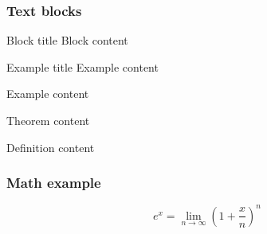 \documentclass{beamer}
\begin{document}
\begin{frame}
  \frametitle{Text blocks}
  
  \begin{block}{Block title}
    Block content
  \end{block}

  \begin{exampleblock}{Example title}
    Example content
  \end{exampleblock}

  \begin{example}
    Example content
  \end{example}

  \begin{theorem}
    Theorem content
  \end{theorem}

  \begin{definition}
    Definition content
  \end{definition}
\end{frame}

\begin{frame}
  \frametitle{Math example}
  \begin{equation}
    e^x = \lim_{n \to \infty}\left(1 + \frac{x}{n}\right)^n
  \end{equation}
\end{frame}
\end{document}
